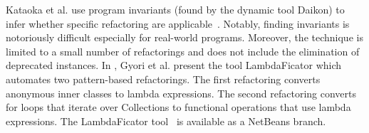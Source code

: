 \documentclass[sigconf,review,anonymous]{acmart}
\begin{document}
%
%
%
Kataoka et al. use
program invariants (found by the dynamic tool Daikon) to infer
whether specific refactoring are applicable~\cite{Kataoka:2001:ASP:846228.848644}. %
Notably, %
finding invariants is notoriously difficult especially
for real-world programs. Moreover, the technique is limited to a small number of refactorings and does not include
the elimination of deprecated instances.
In \cite{conf/sigsoft/GyoriFDL13}, Gyori et al. present the tool {\sc LambdaFicator} which
automates two pattern-based refactorings. The first refactoring converts
anonymous inner classes to lambda expressions. The second
refactoring converts for loops that iterate over Collections
to functional operations that use lambda expressions.
The {\sc LambdaFicator} tool~\cite{DBLP:conf/icse/FranklinGLD04} is available as a
NetBeans branch.



\end{document}
